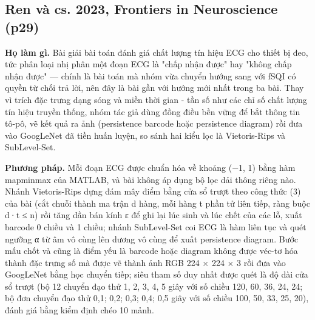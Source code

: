 \documentclass[12pt,a4paper]{article}
\begin{document}
\subsection{Ren và cs. 2023, Frontiers in Neuroscience \normalfont\small (p29)}
\par\vspace{2pt}
\par\vspace{4pt}
\noindent \textbf{Họ làm gì.} Bài giải bài toán đánh giá chất lượng tín hiệu ECG cho thiết bị đeo, tức phân loại nhị phân một đoạn ECG là "chấp nhận được" hay "không chấp nhận được" — chính là bài toán mà nhóm vừa chuyển hướng sang với fSQI có quyền từ chối trả lời, nên đây là bài gần với hướng mới nhất trong ba bài. Thay vì trích đặc trưng dạng sóng và miền thời gian - tần số như các chỉ số chất lượng tín hiệu truyền thống, nhóm tác giả dùng đồng điều bền vững để bắt thông tin tô-pô, vẽ kết quả ra ảnh (persistence barcode hoặc persistence diagram) rồi đưa vào GoogLeNet đã tiền huấn luyện, so sánh hai kiểu lọc là Vietoris-Rips và SubLevel-Set.\par\vspace{3pt}
\noindent \textbf{Phương pháp.} Mỗi đoạn ECG được chuẩn hóa về khoảng (−1, 1) bằng hàm mapminmax của MATLAB, và bài không áp dụng bộ lọc dải thông riêng nào. Nhánh Vietoris-Rips dựng đám mây điểm bằng cửa sổ trượt theo công thức (3) của bài (cắt chuỗi thành ma trận d hàng, mỗi hàng t phần tử liên tiếp, ràng buộc d·t ≤ n) rồi tăng dần bán kính ε để ghi lại lúc sinh và lúc chết của các lỗ, xuất barcode 0 chiều và 1 chiều; nhánh SubLevel-Set coi ECG là hàm liên tục và quét ngưỡng α từ âm vô cùng lên dương vô cùng để xuất persistence diagram. Bước mấu chốt và cũng là điểm yếu là barcode hoặc diagram không được véc-tơ hóa thành đặc trưng số mà được vẽ thành ảnh RGB 224 × 224 × 3 rồi đưa vào GoogLeNet bằng học chuyển tiếp; siêu tham số duy nhất được quét là độ dài cửa sổ trượt (bộ 12 chuyển đạo thử 1, 2, 3, 4, 5 giây với số chiều 120, 60, 36, 24, 24; bộ đơn chuyển đạo thử 0,1; 0,2; 0,3; 0,4; 0,5 giây với số chiều 100, 50, 33, 25, 20), đánh giá bằng kiểm định chéo 10 mảnh.\par\vspace{3pt}
\end{document}
